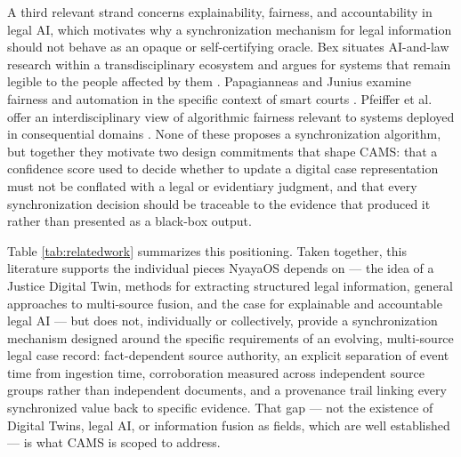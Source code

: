\documentclass[conference]{IEEEtran}
\begin{document}
A third relevant strand concerns explainability, fairness, and
accountability in legal AI, which motivates why a synchronization mechanism
for legal information should not behave as an opaque or self-certifying
oracle. Bex situates AI-and-law research within a transdisciplinary
ecosystem and argues for systems that remain legible to the people affected
by them \cite{bex2025}. Papagianneas and Junius examine fairness and
automation in the specific context of smart courts \cite{papagianneas2023}.
Pfeiffer et al. offer an interdisciplinary view of algorithmic fairness
relevant to systems deployed in consequential domains \cite{pfeiffer2023}.
None of these proposes a synchronization algorithm, but together they
motivate two design commitments that shape CAMS: that a confidence score
used to decide whether to update a digital case representation must not be
conflated with a legal or evidentiary judgment, and that every
synchronization decision should be traceable to the evidence that produced
it rather than presented as a black-box output.

Table \ref{tab:relatedwork} summarizes this positioning. Taken together,
this literature supports the individual pieces NyayaOS depends on --- the
idea of a Justice Digital Twin, methods for extracting structured legal
information, general approaches to multi-source fusion, and the case for
explainable and accountable legal AI --- but does not, individually or
collectively, provide a synchronization mechanism designed around the
specific requirements of an evolving, multi-source legal case record:
fact-dependent source authority, an explicit separation of event time from
ingestion time, corroboration measured across independent source groups
rather than independent documents, and a provenance trail linking every
synchronized value back to specific evidence. That gap --- not the
existence of Digital Twins, legal AI, or information fusion as fields,
which are well established --- is what CAMS is scoped to address.
\end{document}

